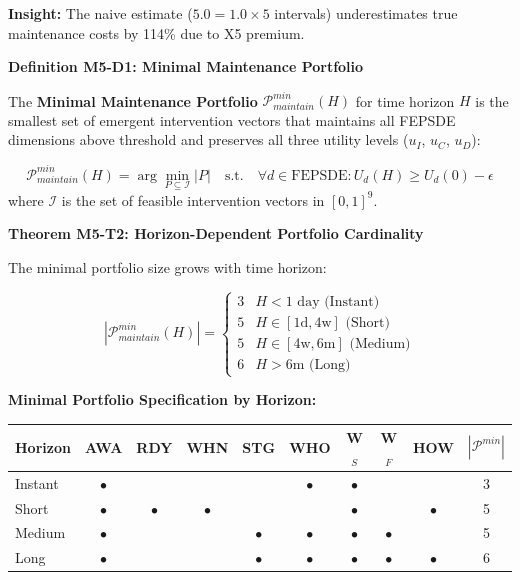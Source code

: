 \begin{tcolorbox}[colback=orange!5!white, colframe=orange!75!black,
    title=\textbf{Method UNTCM-M5: Maintenance Cost Analysis}]
\textbf{Insight:} The naive estimate ($5.0 = 1.0 \times 5$ intervals) underestimates true maintenance costs by 114\% due to X5 premium.

\textbf{Definition M5-D1: Minimal Maintenance Portfolio}

The \textbf{Minimal Maintenance Portfolio} $\mathcal{P}_{maintain}^{min}(H)$ for time horizon $H$ is the smallest set of emergent intervention vectors that maintains all FEPSDE dimensions above threshold and preserves all three utility levels ($u_I$, $u_C$, $u_D$):

\begin{equation}
\mathcal{P}_{maintain}^{min}(H) = \arg\min_{P \subseteq \mathcal{I}} |P| \quad \text{s.t.} \quad \forall d \in \text{FEPSDE}: U_d(H) \geq U_d(0) - \epsilon
\end{equation}
where $\mathcal{I}$ is the set of feasible intervention vectors in $[0,1]^9$.

\textbf{Theorem M5-T2: Horizon-Dependent Portfolio Cardinality}

The minimal portfolio size grows with time horizon:

\begin{equation}
|\mathcal{P}_{maintain}^{min}(H)| = \begin{cases}
3 & H < 1 \text{ day (Instant)} \\
5 & H \in [1\text{d}, 4\text{w}] \text{ (Short)} \\
5 & H \in [4\text{w}, 6\text{m}] \text{ (Medium)} \\
6 & H > 6\text{m} \text{ (Long)}
\end{cases}
\end{equation}

\textbf{Minimal Portfolio Specification by Horizon:}

\begin{center}
\renewcommand{\arraystretch}{1.3}
\begin{tabular}{@{}lccccccccc@{}}
\toprule
\textbf{Horizon} & AWA & RDY & WHN & STG & WHO & W$_S$ & W$_F$ & HOW & $|\mathcal{P}^{min}|$ \\
\midrule
Instant & $\bullet$ & & & & $\bullet$ & $\bullet$ & & & 3 \\
Short & $\bullet$ & $\bullet$ & $\bullet$ & & & $\bullet$ & & $\bullet$ & 5 \\
Medium & $\bullet$ & & & $\bullet$ & $\bullet$ & $\bullet$ & $\bullet$ & & 5 \\
Long & $\bullet$ & & & $\bullet$ & $\bullet$ & $\bullet$ & $\bullet$ & $\bullet$ & 6 \\
\bottomrule
\end{tabular}
\end{center}


\end{tcolorbox}
